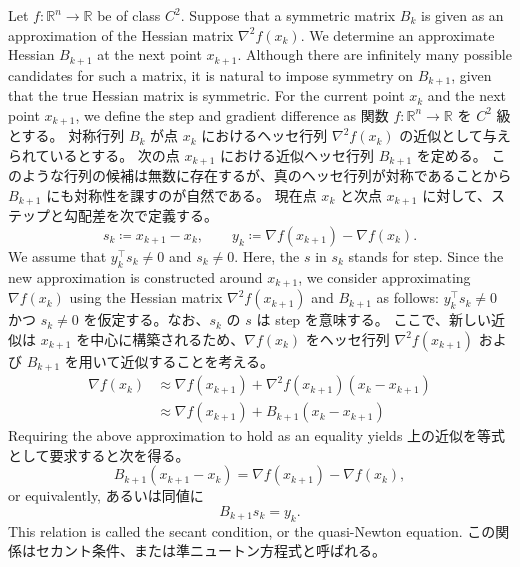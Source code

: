 \documentclass[0_main]{subfiles}
\begin{document}
\ifEn
    Let $f\colon \mathbb{R}^n \to \mathbb{R}$ be of class $C^2$.
    Suppose that a symmetric matrix $B_k$ is given as an approximation of the Hessian matrix $\nabla^2 f(x_k)$.
    We determine an approximate Hessian $B_{k+1}$ at the next point $x_{k+1}$.
    Although there are infinitely many possible candidates for such a matrix, it is natural to impose symmetry on $B_{k+1}$, given that the true Hessian matrix is symmetric.
    For the current point $x_k$ and the next point $x_{k+1}$,
    we define the step and gradient difference as
\else
    関数 $f\colon \mathbb{R}^n \to \mathbb{R}$ を $C^2$ 級とする。
    対称行列 $B_k$ が点 $x_k$ におけるヘッセ行列 $\nabla^2 f(x_k)$ の近似として与えられているとする。
    次の点 $x_{k+1}$ における近似ヘッセ行列 $B_{k+1}$ を定める。
    このような行列の候補は無数に存在するが、真のヘッセ行列が対称であることから $B_{k+1}$ にも対称性を課すのが自然である。
    現在点 $x_k$ と次点 $x_{k+1}$ に対して、ステップと勾配差を次で定義する。
\fi
\begin{equation*}
    s_k \coloneq x_{k+1} - x_k, \qquad   y_k \coloneq \nabla f(x_{k+1}) - \nabla f(x_k).
\end{equation*}
\ifEn
    We assume that $y_k^\top s_k \neq 0$ and $s_k \neq 0$.
    Here, the $s$ in $s_k$ stands for step.
    Since the new approximation is constructed around $x_{k+1}$, we consider approximating $\nabla f(x_k)$ using the Hessian matrix $\nabla^2 f(x_{k+1})$ and $B_{k+1}$ as follows:
\else
    $y_k^\top s_k \neq 0$ かつ $s_k \neq 0$ を仮定する。なお、$s_k$ の $s$ は step を意味する。
    ここで、新しい近似は $x_{k+1}$ を中心に構築されるため、$\nabla f(x_k)$ をヘッセ行列 $\nabla^2 f(x_{k+1})$ および $B_{k+1}$ を用いて近似することを考える。
\fi
\begin{align*}
    \nabla f(x_k) & \approx \nabla f(x_{k+1}) + \nabla^2 f(x_{k+1})(x_k - x_{k+1}) \\
                  & \approx \nabla f(x_{k+1}) + B_{k+1}(x_k - x_{k+1})
\end{align*}
\ifEn
    Requiring the above approximation to hold as an equality yields
\else
    上の近似を等式として要求すると次を得る。
\fi
\begin{equation*}
    B_{k+1}(x_{k+1} - x_k) = \nabla f(x_{k+1}) - \nabla f(x_k),
\end{equation*}
\ifEn
    or equivalently,
\else
    あるいは同値に
\fi
\begin{equation*}
    B_{k+1} s_k = y_k.
\end{equation*}
\ifEn
    This relation is called the secant condition, or the quasi-Newton equation.
\else
    この関係はセカント条件、または準ニュートン方程式と呼ばれる。
\fi
\end{document}

